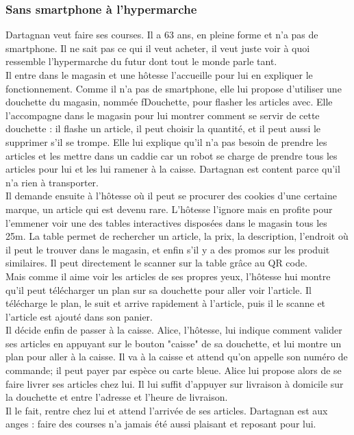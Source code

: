 				\subsubsection{Sans \gls{smartphone} à l'\gls{hypermarche}}
					Dartagnan veut faire ses courses. Il a 63 ans, en pleine forme et n'a pas de \gls{smartphone}. Il ne sait pas ce qui il veut acheter, il veut juste voir à quoi ressemble l'\gls{hypermarche} du futur dont tout le monde parle tant.\\
					Il entre dans le magasin et une hôtesse l'accueille pour lui en expliquer le fonctionnement. Comme il n'a pas de \gls{smartphone}, elle lui propose d'utiliser une \gls{douchette} du magasin, nommée fDouchette, pour flasher les articles avec.
					Elle l'accompagne dans le magasin pour lui montrer comment se servir de cette \gls{douchette} : il flashe un article, il peut choisir la quantité, et il peut aussi le supprimer s'il se trompe. Elle lui explique qu'il n'a pas besoin de prendre les articles et les mettre dans un \gls{caddie} car un \gls{robot} se charge de prendre tous les articles pour lui et les lui ramener à la caisse. Dartagnan est content parce qu'il n'a rien à transporter.\\
					Il demande ensuite à l'hôtesse où il peut se procurer des cookies d'une certaine marque, un article qui est devenu rare. L'hôtesse l'ignore mais en profite pour l'emmener voir une des tables interactives disposées dans le magasin tous les 25m. La table permet de rechercher un article, la prix, la description, l'endroit où il peut le trouver dans le magasin, et enfin s'il y a des promos sur les produit similaires. Il peut directement le scanner sur la table grâce  au QR code.\\
					Mais comme il aime voir les articles de ses propres yeux, l'hôtesse hui montre qu'il peut télécharger un plan sur sa \gls{douchette} pour aller voir l'article. Il télécharge le plan, le suit et arrive rapidement à l'article, puis il le scanne et l'article est ajouté dans son panier.\\
					Il décide enfin de passer à la caisse. Alice, l'hôtesse, lui indique comment valider ses articles en appuyant sur le bouton "caisse" de sa \gls{douchette}, et lui montre un plan pour aller à la caisse.
Il va à la caisse et attend qu'on appelle son numéro de commande; il peut payer par espèce ou carte bleue. Alice lui propose alors de se faire livrer ses articles chez lui. Il lui suffit d'appuyer sur livraison à domicile sur la \gls{douchette} et entre l'adresse et l'heure de livraison.\\
Il le fait, rentre chez lui et attend l'arrivée de ses articles. Dartagnan est aux anges : faire des courses n'a jamais été aussi plaisant et reposant pour lui.
